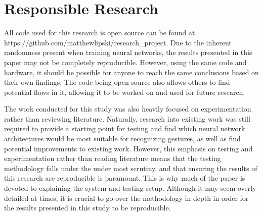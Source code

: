 \section{Responsible Research}\label{sec:responsible-research}
All code used for this research is open source can be found at https://github.com/matthewlipski/research\_project.
Due to the inherent randomness present when training neural networks, the results presented in this paper may not be completely reproducible.
However, using the same code and hardware, it should be possible for anyone to reach the same conclusions based on their own findings.
The code being open source also allows others to find potential flaws in it, allowing it to be worked on and used for future research.

The work conducted for this study was also heavily focused on experimentation rather than reviewing literature.
Naturally, research into existing work was still required to provide a starting point for testing and find which neural network architectures would be most suitable for recognizing gestures, as well as find potential improvements to existing work.
However, this emphasis on testing and experimentation rather than reading literature means that the testing methodology falls under the under most scrutiny, and that ensuring the results of this research are reproducible is paramount.
This is why much of the paper is devoted to explaining the system and testing setup.
Although it may seem overly detailed at times, it is crucial to go over the methodology in depth in order for the results presented in this study to be reproducible.
